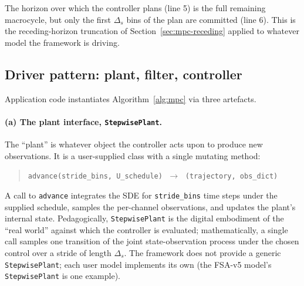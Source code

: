 The horizon over which the controller plans (line 5) is the full
remaining macrocycle, but only the first $\Delta_s$ bins of the plan
are committed (line 6). This is the receding-horizon truncation of
Section~\ref{sec:mpc-receding} applied to whatever model the
framework is driving.

\subsection{Driver pattern: plant, filter, controller} \label{sec:mpc-driver}

Application code instantiates Algorithm~\ref{alg:mpc} via three
artefacts.

\paragraph{(a) The plant interface, \texttt{StepwisePlant}.}
The ``plant'' is whatever object the controller acts upon to produce
new observations. It is a user-supplied class with a single mutating
method:
\begin{quote}\small
\verb|advance(stride_bins, U_schedule)|
$\;\to\;$ \texttt{(trajectory, obs\_dict)}
\end{quote}
A call to \texttt{advance} integrates the SDE for \texttt{stride\_bins}
time steps under the supplied schedule, samples the per-channel
observations, and updates the plant's internal state. Pedagogically,
\texttt{StepwisePlant} is the digital embodiment of the ``real world''
against which the controller is evaluated; mathematically, a single
call samples one transition of the joint state-observation process
under the chosen control over a stride of length $\Delta_s$. The
framework does not provide a generic \texttt{StepwisePlant}; each
user model implements its own (the FSA-v5 model's
\texttt{StepwisePlant} is one example).

